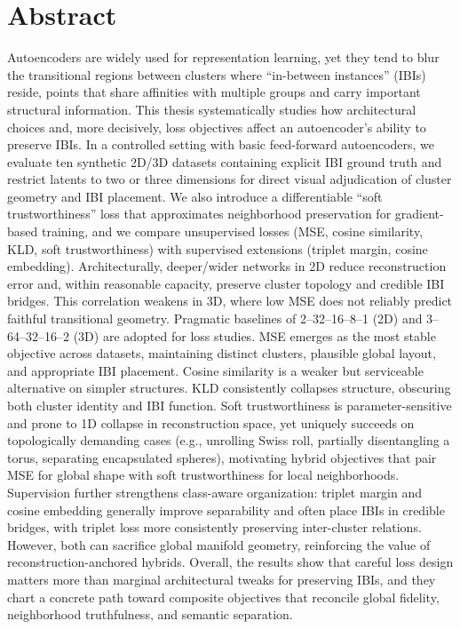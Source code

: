 \chapter*{Abstract}

Autoencoders are widely used for representation learning, yet they tend to blur the transitional regions between clusters where “in-between instances” (IBIs) reside, points that share affinities with multiple groups and carry important structural information. This thesis systematically studies how architectural choices and, more decisively, loss objectives affect an autoencoder’s ability to preserve IBIs. In a controlled setting with basic feed-forward autoencoders, we evaluate ten synthetic 2D/3D datasets containing explicit IBI ground truth and restrict latents to two or three dimensions for direct visual adjudication of cluster geometry and IBI placement. We also introduce a differentiable “soft trustworthiness” loss that approximates neighborhood preservation for gradient-based training, and we compare unsupervised losses (MSE, cosine similarity, KLD, soft trustworthiness) with supervised extensions (triplet margin, cosine embedding). 
Architecturally, deeper/wider networks in 2D reduce reconstruction error and, within reasonable capacity, preserve cluster topology and credible IBI bridges. This correlation weakens in 3D, where low MSE does not reliably predict faithful transitional geometry. Pragmatic baselines of 2–32–16–8–1 (2D) and 3–64–32–16–2 (3D) are adopted for loss studies. 
MSE emerges as the most stable objective across datasets, maintaining distinct clusters, plausible global layout, and appropriate IBI placement. Cosine similarity is a weaker but serviceable alternative on simpler structures. KLD consistently collapses structure, obscuring both cluster identity and IBI function. Soft trustworthiness is parameter-sensitive and prone to 1D collapse in reconstruction space, yet uniquely succeeds on topologically demanding cases (e.g., unrolling Swiss roll, partially disentangling a torus, separating encapsulated spheres), motivating hybrid objectives that pair MSE for global shape with soft trustworthiness for local neighborhoods. 
Supervision further strengthens class-aware organization: triplet margin and cosine embedding generally improve separability and often place IBIs in credible bridges, with triplet loss more consistently preserving inter-cluster relations. However, both can sacrifice global manifold geometry, reinforcing the value of reconstruction-anchored hybrids. 
Overall, the results show that careful loss design matters more than marginal architectural tweaks for preserving IBIs, and they chart a concrete path toward composite objectives that reconcile global fidelity, neighborhood truthfulness, and semantic separation.